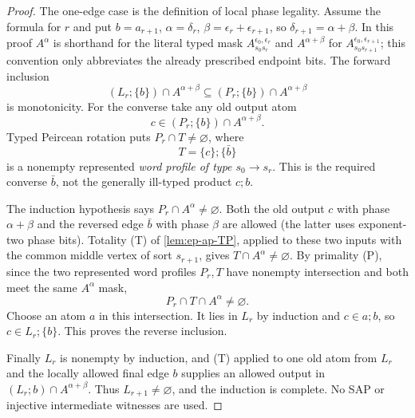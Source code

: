 \begin{proof}
The one-edge case is the definition
of local phase legality. Assume the
formula for $r$ and put
$b=a_{r+1}$, $\alpha=\delta_r$,
$\beta=\epsilon_r+\epsilon_{r+1}$,
so $\delta_{r+1}=\alpha+\beta$.
In this proof $A^\alpha$ is shorthand for the
literal typed mask $A_{s_0s_r}^{\epsilon_0,\epsilon_r}$
and $A^{\alpha+\beta}$ for
$A_{s_0s_{r+1}}^{\epsilon_0,\epsilon_{r+1}}$;
this convention only abbreviates the already
prescribed endpoint bits. The forward inclusion
\[
 (L_r;\{b\})\cap A^{\alpha+\beta}
 \subseteq (P_r;\{b\})\cap A^{\alpha+\beta}
\]
is monotonicity. For the converse take
any old output atom
\[
 c\in (P_r;\{b\})\cap A^{\alpha+\beta}.
\]
Typed Peircean rotation puts
$P_r\cap T\ne\varnothing$, where
\[
       T=\{c\};\{\bar b\}
\]
is a nonempty represented \emph{word
profile of type $s_0\to s_r$}.
This is the required converse $\bar b$,
not the generally ill-typed product
$c;b$.

The induction hypothesis says
$P_r\cap A^{\alpha}\ne\varnothing$.
Both the old output $c$ with phase
$\alpha+\beta$ and the reversed edge
$\bar b$ with phase $\beta$ are allowed
(the latter uses exponent-two phase
bits). Totality (T) of
\cref{lem:ep-ap-TP}, applied to these
two inputs with the common middle
vertex of sort $s_{r+1}$, gives
$T\cap A^{\alpha}\ne\varnothing$.
By primality (P), since the two
represented word profiles $P_r,T$
have nonempty intersection and both
meet the same $A^{\alpha}$ mask,
\[
             P_r\cap T\cap A^\alpha
                        \ne\varnothing .
\]
Choose an atom $a$ in this intersection.
It lies in $L_r$ by induction and
$c\in a;b$, so $c\in L_r;\{b\}$.
This proves the reverse inclusion.

Finally $L_r$ is nonempty by induction,
and (T) applied to one old atom from
$L_r$ and the locally allowed final
edge $b$ supplies an allowed output
in $(L_r;b)\cap A^{\alpha+\beta}$.
Thus $L_{r+1}\ne\varnothing$, and the
induction is complete. No SAP or
injective intermediate witnesses
are used.
\end{proof}

